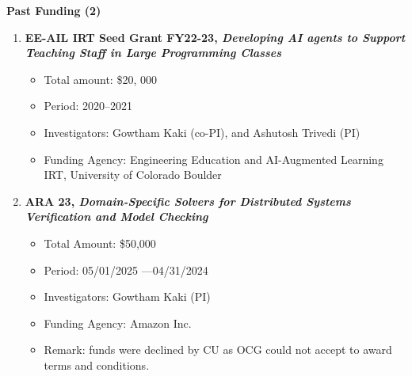 \documentclass{article}
\begin{document}
\noindent\textbf{Past Funding (2) }
\begin{enumerate}
  \item {\bf EE-AIL IRT Seed Grant FY22-23, \emph{Developing AI agents to Support Teaching Staff in Large Programming Classes}}
  \begin{itemize}
  \item
    Total amount: \$20, 000
  \item  
    Period: 2020--2021
  \item Investigators:
   Gowtham Kaki (co-PI), and Ashutosh Trivedi (PI)
  \item Funding Agency: Engineering Education and AI-Augmented Learning IRT, University of Colorado Boulder
  \end{itemize}

  \item {\bf ARA 23, \emph{Domain-Specific Solvers for Distributed Systems
Verification and Model Checking}}
  \begin{itemize}
    \item 
      Total Amount: \$50,000
    \item 
      Period: 05/01/2025 ---04/31/2024
    \item 
      Investigators: Gowtham Kaki (PI)
    \item 
      Funding Agency: Amazon Inc.
    \item Remark: funds were declined by CU as OCG could not accept to award terms and conditions.
\end{itemize}  
\end{enumerate}

\medskip
\end{document}

